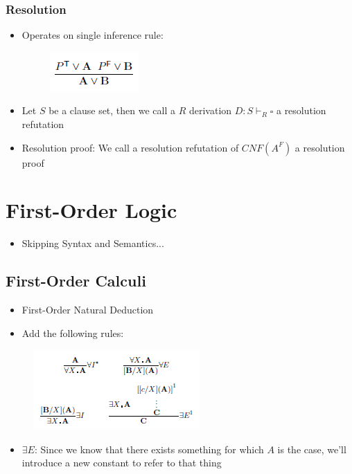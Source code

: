 \documentclass{scrartcl}
\begin{document}
\subsubsection{Resolution}
\begin{itemize}
    \item
        Operates on single inference rule:
\begin{figure}[H]
            \centering
            \includegraphics[scale=0.8]{figures/312}
\end{figure} 
    \item
        Let $S$ be a clause set, then we call a $R$ derivation $D: S \vdash_R \square$ a resolution refutation
    \item
        Resolution proof: We call a resolution refutation of $CNF(A^F)$ a resolution proof
\end{itemize}

\section{First-Order Logic}
\begin{itemize}
    \item
        Skipping Syntax and Semantics...
\end{itemize}
\subsection{First-Order Calculi}
\begin{itemize}
    \item
        First-Order Natural Deduction
    \item
        Add the following rules:
\end{itemize}
\begin{figure}[H]
            \centering
            \includegraphics[scale=1]{figures/403}
\end{figure} 

\begin{itemize}
    \item
        $\exists E$: Since we know that there exists something for which $A$ is the case, we'll introduce a new constant to refer to that thing
\end{itemize}
\end{document}
